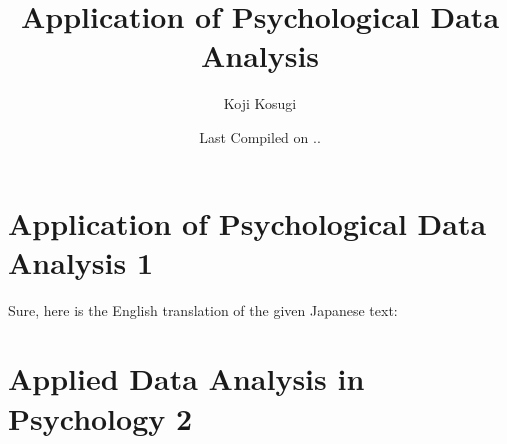 \documentclass[dvipsnames]{ltjsbook}
\begin{document}


\VerbatimFootnotes
\title{Application of Psychological Data Analysis}
\author{Koji Kosugi}
\date{Last Compiled on \number\year .\number\month .\number\day}
\maketitle
\setcounter{tocdepth}{1}



\tableofcontents

\linenumbers
\part{Application of Psychological Data Analysis 1}















Sure, here is the English translation of the given Japanese text:

\part{Applied Data Analysis in Psychology 2}
















\appendix




\end{document}
